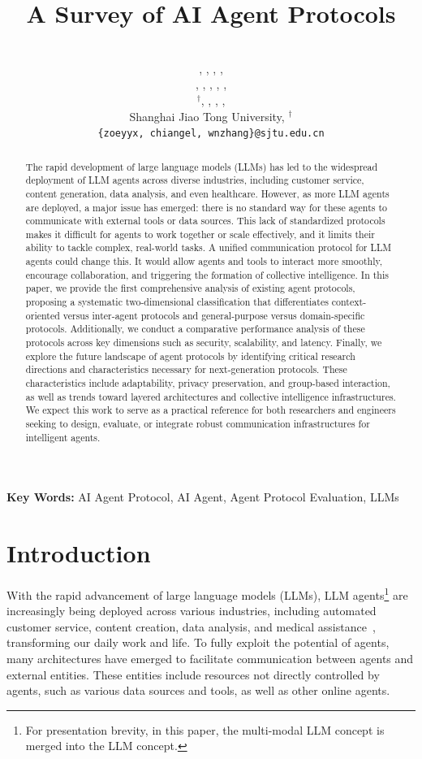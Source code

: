 \documentclass[10pt,preprint]{article}
\title{\vspace{+3cm}A Survey of AI Agent Protocols\vspace{0cm}}
\author{\\
\name{Yingxuan Yang}, \name{Huacan Chai}, \name{Yuanyi Song}, \name{Siyuan Qi}, \\
\name{Muning Wen}, \name{Ning Li}, \name{Junwei Liao}, \name{Haoyi Hu}, \name{Jianghao Lin\thanks{Corresponding author.}}, \\
\name{Gaowei Chang}$^\dag$, \name{Weiwen Liu}, \name{Ying Wen}, \name{Yong Yu}, \name{Weinan Zhang} \vspace{+0.15cm}\\
Shanghai Jiao Tong University, $^\dag$\text{ANP Community} \\
\texttt{\{zoeyyx, chiangel, wnzhang\}@sjtu.edu.cn}
}
\begin{document}
\maketitle

\begin{abstract}
	The rapid development of large language models (LLMs) has led to the widespread deployment of LLM agents across diverse industries, including customer service, content generation, data analysis, and even healthcare. However, as more LLM agents are deployed, a major issue has emerged: there is no standard way for these agents to communicate with external tools or data sources. This lack of standardized protocols makes it difficult for agents to work together or scale effectively, and it limits their ability to tackle complex, real-world tasks. A unified communication protocol for LLM agents could change this. It would allow agents and tools to interact more smoothly, encourage collaboration, and triggering the formation of collective intelligence.
    In this paper, we provide the first comprehensive analysis of existing agent protocols, proposing a systematic two-dimensional classification that differentiates context-oriented versus inter-agent protocols and general-purpose versus domain-specific protocols. Additionally, we conduct a comparative performance analysis of these protocols across key dimensions such as security, scalability, and latency. 
    Finally, we explore the future landscape of agent protocols by identifying critical research directions and characteristics necessary for next-generation protocols. These characteristics include adaptability, privacy preservation, and group-based interaction, as well as trends toward layered architectures and collective intelligence infrastructures.
    We expect this work to serve as a practical reference for both researchers and engineers seeking to design, evaluate, or integrate robust communication infrastructures for intelligent agents.
\end{abstract}


\hspace{32pt} \textbf{Key Words:} AI Agent Protocol, AI Agent, Agent Protocol Evaluation, LLMs


\newpage
\tableofcontents

\section{Introduction}
With the rapid advancement of large language models (LLMs), LLM agents\footnote{For presentation brevity, in this paper, the multi-modal LLM concept \citep{caffagni2024r} is merged into the LLM concept.} are increasingly being deployed across various industries, including automated customer service, content creation, data analysis, and medical assistance~\citep{openai2024gpt4technicalreport,gottweis2025aicoscientist,yang2025whosmvpgametheoreticevaluation,Guo2024LargeLM,zhou2024tradenhancingllmagents}, transforming our daily work and life. To fully exploit the potential of agents, many architectures have emerged to facilitate communication between agents and external entities. These entities include resources not directly controlled by agents, such as various data sources and tools, as well as other online agents.
\end{document}
